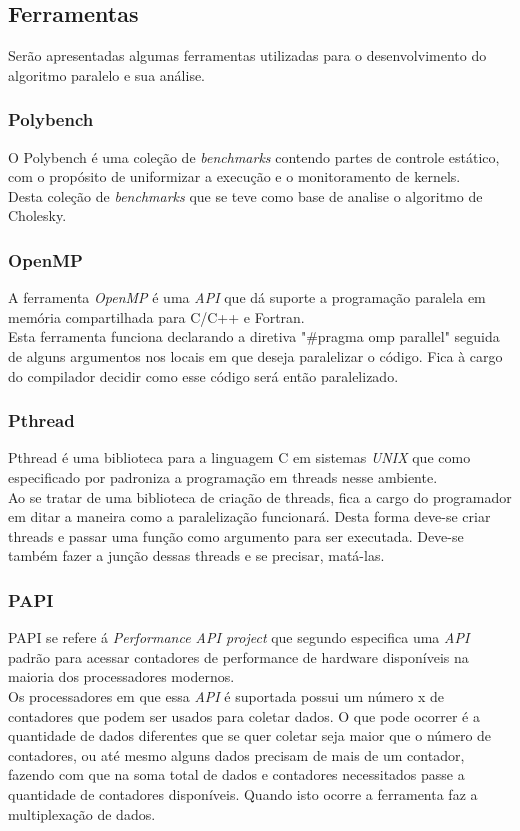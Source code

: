 \documentclass[12pt]{article}
\newcommand\tab[1][1cm]{\hspace*{#1}}
\begin{document}
\subsection{Ferramentas}\label{subsec:cargabalanc}
\tab Serão apresentadas algumas ferramentas utilizadas para  o desenvolvimento do  algoritmo paralelo e sua análise.
\subsubsection{Polybench}
\tab O Polybench é uma coleção de \textit{benchmarks} contendo partes de controle estático, com o propósito de uniformizar a execução e o monitoramento de kernels. 
\\
\tab Desta coleção de \textit{benchmarks} que se teve como base de analise o algoritmo de Cholesky.  

\subsubsection{OpenMP}\label{subsubsec:omp}
\tab A ferramenta \textit{OpenMP} é uma \textit{API} que dá suporte a programação paralela em memória compartilhada para C/C++ e Fortran.
\\
\tab Esta ferramenta funciona declarando a diretiva "\#pragma omp parallel" seguida de alguns argumentos nos locais em que deseja paralelizar o código. Fica à cargo do compilador decidir como esse código será então paralelizado. 
\subsubsection{Pthread}\label{subsubsec:pthread}
\tab Pthread é uma biblioteca para a linguagem C em sistemas \textit{UNIX} que como especificado por \cite{pthread} padroniza a programação em threads nesse ambiente.
\\
\tab Ao se tratar de uma biblioteca de criação de threads, fica a cargo do programador em ditar a maneira como a paralelização funcionará. Desta forma deve-se criar threads e passar uma função como argumento para ser executada. Deve-se também fazer a junção dessas threads  e se precisar, matá-las.
\subsubsection{PAPI}\label{subsubsec:papi}
\tab PAPI se refere á \textit{Performance API project} que segundo \cite{papi} especifica uma \textit{API} padrão para acessar contadores de performance de hardware disponíveis na maioria dos processadores modernos.
\\
\tab Os processadores em que essa \textit{API} é suportada possui um número x de contadores que podem ser usados para coletar dados. O que pode ocorrer é a quantidade de dados diferentes que se quer coletar seja maior que o número de contadores, ou até mesmo alguns dados precisam de mais de um contador, fazendo com que na soma total de dados e contadores necessitados passe a quantidade de contadores disponíveis. Quando isto ocorre a ferramenta faz a multiplexação de dados.  
\end{document}
